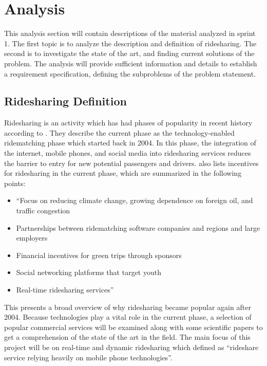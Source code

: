 \section{Analysis}\label{s:s1anal}
This analysis section will contain descriptions of the material analyzed in sprint 1.
The first topic is to analyze the description and definition of ridesharing.
The second is to investigate the state of the art, and finding current solutions of the problem.
The analysis will provide sufficient information and details to establish a requirement specification, defining the subproblems of the problem statement. 

\subsection{Ridesharing Definition}
Ridesharing is an activity which has had phases of popularity in recent history according to \citet{doi:10.1080/01441647.2011.621557}.
They describe the current phase as the technology-enabled ridematching phase which started back in 2004.
In this phase, the integration of the internet, mobile phones, and social media into ridesharing services reduces the barrier to entry for new potential passengers and drivers.
\citet{doi:10.1080/01441647.2011.621557} also lists incentives for ridesharing in the current phase, which are summarized in the following points:

\begin{itemize}
	\item ``Focus on reducing climate change, growing dependence on foreign oil, and traffic congestion
	\item Partnerships between ridematching software companies and regions and large employers
	\item Financial incentives for green trips through sponsors
	\item Social networking platforms that target youth
	\item Real-time ridesharing services''
\end{itemize}

This presents a broad overview of why ridesharing became popular again after 2004.
Because technologies play a vital role in the current phase, a selection of popular commercial services will be examined along with some scientific papers to get a comprehension of the state of the art in the field.
The main focus of this project will be on real-time and dynamic ridesharing which \citet{amey2011real} defined as ``rideshare service relying heavily on mobile phone technologies''.

